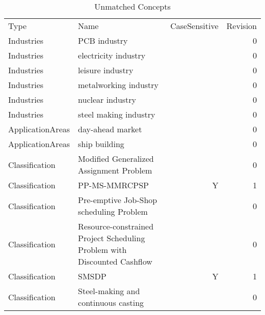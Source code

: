 {\scriptsize
\begin{longtable}{lp{10cm}rr}
\rowcolor{white}\caption{Unmatched Concepts}\\ \toprule
\rowcolor{white}Type & Name & CaseSensitive & Revision\\ \midrule
\endhead
\bottomrule
\endfoot
Industries & PCB industry &  & 0\\Industries & electricity industry &  & 0\\Industries & leisure industry &  & 0\\Industries & metalworking industry &  & 0\\Industries & nuclear industry &  & 0\\Industries & steel making industry &  & 0\\ApplicationAreas & day-ahead market &  & 0\\ApplicationAreas & ship building &  & 0\\Classification & Modified Generalized Assignment Problem &  & 0\\Classification & PP-MS-MMRCPSP & Y & 1\\Classification & Pre-emptive Job-Shop scheduling Problem &  & 0\\Classification & Resource-constrained Project Scheduling Problem with Discounted Cashflow &  & 0\\Classification & SMSDP & Y & 1\\Classification & Steel-making and continuous casting &  & 0\\\end{longtable}
}

